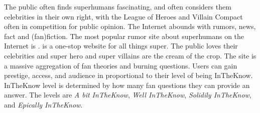 \documentclass[blue]{LRSguildcamp1}
\begin{document}
The public often finds superhumans fascinating, and often considers them celebrities in their own right, with the League of Heroes and Villain Compact often in competition for public opinion.  The Internet abounds with rumors, news, fact and (fan)fiction.  The most popular rumor site about superhumans on the Internet is \pTweenwebsite{}. \pTweenwebsite{} is a one-stop website for all things super. The public loves their celebrities and super hero and super villains are the cream of the crop. The site is a massive aggregation of fan theories and burning questions. Users can gain prestige, access, and audience in proportional to their level of being InTheKnow. InTheKnow level is determined by how many fan questions they can provide an answer. The levels are \textit{A bit InTheKnow}, \textit{Well InTheKnow}, \textit{Solidily InTheKnow}, and \textit{Epically InTheKnow}.
\end{document}
